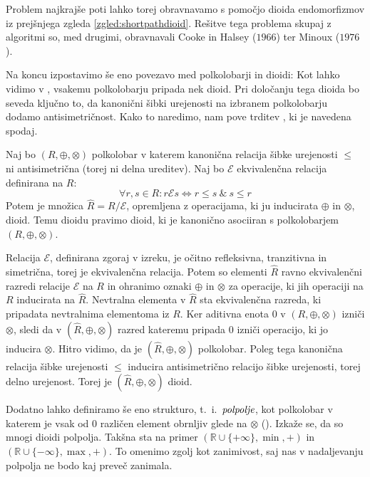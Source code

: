 \documentclass[mat1]{fmfdelo}
\newcommand{\R}{\mathbb{R}}
\newcommand{\pojem}[1]{\ensuremath{\emph{#1}}}
\begin{document}
Problem najkrajše poti lahko torej obravnavamo s pomočjo dioida endomorfizmov iz prejšnjega zgleda \ref{zgled:shortpathdioid}. Rešitve tega problema skupaj z algoritmi so, med drugimi, obravnavali Cooke in Halsey ($1966$) ter Minoux ($1976$).

Na koncu izpostavimo še eno povezavo med polkolobarji in dioidi: Kot lahko vidimo v \cite[poglavje 6.\,9.\,]{bib:Gondran}, vsakemu polkolobarju pripada nek dioid. Pri določanju tega dioida bo seveda ključno to, da kanonični šibki urejenosti na izbranem polkolobarju dodamo antisimetričnost. Kako to naredimo, nam pove trditev \cite[trditev 6.\,9.\,1.\,]{bib:Gondran}, ki je navedena spodaj.

\begin{trditev}
	Naj bo $(R, \oplus, \otimes)$ polkolobar v katerem kanonična relacija šibke urejenosti  $\leq$ ni antisimetrična (torej ni delna ureditev). Naj bo $\mathcal{E}$ ekvivalenčna relacija definirana na $R$:
$$\forall r, s\in R: r\mathcal{E}s \iff r\leq s ~\&~ s \leq r$$
	Potem je množica $\widehat{R} = R / \mathcal{E}$, opremljena z operacijama, ki ju inducirata $\oplus$ in $\otimes$, dioid. Temu dioidu pravimo dioid, ki je kanonično asociiran s polkolobarjem $(R, \oplus, \otimes)$.
\end{trditev}
\begin{dokaz}
	Relacija $\mathcal{E}$, definirana zgoraj v izreku, je očitno refleksivna, tranzitivna in simetrična, torej je ekvivalenčna relacija. Potem so elementi $\widehat{R}$ ravno ekvivalenčni razredi relacije $\mathcal{E}$ na $R$ in ohranimo oznaki $\oplus$ in $\otimes$ za operacije, ki jih operaciji na $R$ inducirata na $\widehat{R}$. Nevtralna elementa v $\widehat{R}$ sta ekvivalenčna razreda, ki pripadata nevtralnima elementoma iz $R$. Ker aditivna enota $0$ v $(R, \oplus, \otimes)$ izniči $\otimes$, sledi da v $(\widehat{R}, \oplus, \otimes)$ razred kateremu pripada $0$ izniči operacijo, ki jo inducira $\otimes$. Hitro vidimo, da je $(\widehat{R}, \oplus, \otimes)$ polkolobar. Poleg tega kanonična relacija šibke urejenosti $\leq$ inducira antisimetrično relacijo šibke urejenosti, torej delno urejenost. Torej je $(\widehat{R}, \oplus, \otimes)$ dioid.
\end{dokaz}
\begin{opomba}
	Dodatno lahko definiramo še eno strukturo, t.~i.~\pojem{polpolje}, kot polkolobar v katerem je vsak od $0$ različen element obrnljiv glede na $\otimes$ (\cite[poglavje 1, definicija 5.\,2.\,3.\,]{bib:Gondran}). Izkaže se, da so mnogi dioidi polpolja. Takšna sta na primer $(\R\cup\{+\infty\}, \min, +)$ in $(\R\cup\{-\infty\}, \max, +)$. To omenimo zgolj kot zanimivost, saj nas v nadaljevanju polpolja ne bodo kaj preveč zanimala.
\end{opomba}
\end{document}
